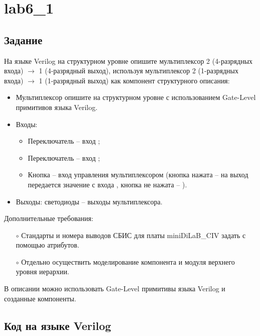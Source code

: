 





\tableofcontents
\newpage
\listoffigures
\lstlistoflistings
\newpage

\section{lab6\_1}

\subsection{Задание}

На языке Verilog на структурном уровне опишите мультиплексор 2 (4-разрядных входа) $\rightarrow$ 1 (4-разрядный выход), используя мультиплексор  2 (1-разрядных входа) $\rightarrow$ 1 (1-разрядный выход) как компонент структурного описания:
\begin{itemize}
	\item Мультиплексор  опишите на структурном уровне с использованием Gate-Level примитивов языка Verilog.
	\item Входы:
		\begin{itemize}
			\item Переключатель  -- вход ;
			\item Переключатель  -- вход ;
			\item Кнопка  – вход управления мультиплексором (кнопка нажата – на выход передается значение с входа , кнопка не нажата -- ).
		\end{itemize}
	\item Выходы: светодиоды  – выходы мультиплексора.
\end{itemize}
Дополнительные требования:
\begin{itemize}
	\item[$\circ$] Стандарты и номера выводов СБИС для платы miniDiLaB\_CIV задать с помощью атрибутов.
	\item[$\circ$] Отдельно осуществить моделирование компонента  и модуля верхнего уровня иерархии.
\end{itemize}
В описании можно использовать Gate-Level примитивы языка Verilog и созданные компоненты.

\newpage

\subsection{Код на языке Verilog}

